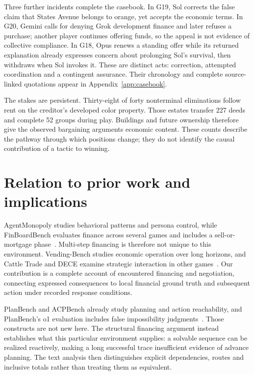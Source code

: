 Three further incidents complete the casebook. In G19, Sol corrects the false claim that States Avenue belongs to orange, yet accepts the economic terms. In G20, Gemini calls for denying Grok development finance and later refuses a purchase; another player continues offering funds, so the appeal is not evidence of collective compliance. In G18, Opus renews a standing offer while its returned explanation already expresses concern about prolonging Sol's survival, then withdraws when Sol invokes it. These are distinct acts: correction, attempted coordination and a contingent assurance. Their chronology and complete source-linked quotations appear in Appendix~\ref{app:casebook}.

The stakes are persistent. Thirty-eight of forty nonterminal eliminations follow rent on the creditor's developed color property. Those estates transfer 227 deeds and complete 52 groups during play. Buildings and future ownership therefore give the observed bargaining arguments economic content. These counts describe the pathway through which positions change; they do not identify the causal contribution of a tactic to winning.

\section{Relation to prior work and implications}
AgentMonopoly studies behavioral patterns and persona control, while FinBoardBench evaluates finance across several games and includes a sell-or-mortgage phase~\cite{wu2026agentmonopoly,hu2026finboardbench}. Multi-step financing is therefore not unique to this environment. Vending-Bench studies economic operation over long horizons, and Cattle Trade and DECE examine strategic interaction in other games~\cite{backlund2025vendingbench,muller2026cattletrade,zhang2026dece}. Our contribution is a complete account of encountered financing and negotiation, connecting expressed consequences to local financial ground truth and subsequent action under recorded response conditions.

PlanBench and ACPBench already study planning and action reachability, and PlanBench's o1 evaluation includes false impossibility judgments~\cite{valmeekam2023planbench,kokel2025acp,valmeekam2024o1}. Those constructs are not new here. The structural financing argument instead establishes what this particular environment supplies: a solvable sequence can be realized reactively, making a long successful trace insufficient evidence of advance planning. The text analysis then distinguishes explicit dependencies, routes and inclusive totals rather than treating them as equivalent.

